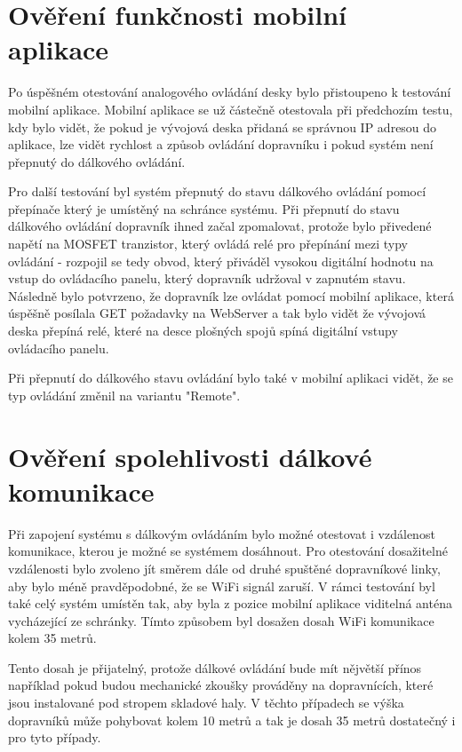 \section{Ověření funkčnosti mobilní aplikace}

Po úspěšném otestování analogového ovládání desky bylo přistoupeno k testování mobilní aplikace. Mobilní aplikace se už částečně otestovala při předchozím testu, kdy bylo vidět, že pokud je vývojová deska přidaná se správnou IP adresou do aplikace, lze vidět rychlost a způsob ovládání dopravníku i pokud systém není přepnutý do dálkového ovládání.

Pro další testování byl systém přepnutý do stavu dálkového ovládání pomocí přepínače který je umístěný na schránce systému. Při přepnutí do stavu dálkového ovládání dopravník ihned začal zpomalovat, protože bylo přivedené napětí na MOSFET tranzistor, který ovládá relé pro přepínání mezi typy ovládání - rozpojil se tedy obvod, který přiváděl vysokou digitální hodnotu na vstup do ovládacího panelu, který dopravník udržoval v zapnutém stavu. Následně bylo potvrzeno, že dopravník lze ovládat pomocí mobilní aplikace, která úspěšně posílala GET požadavky na WebServer a tak bylo vidět že vývojová deska přepíná relé, které na desce plošných spojů spíná digitální vstupy ovládacího panelu.

Při přepnutí do dálkového stavu ovládání bylo také v mobilní aplikaci vidět, že se typ ovládání změnil na variantu "Remote".

\section{Ověření spolehlivosti dálkové komunikace}

Při zapojení systému s dálkovým ovládáním bylo možné otestovat i vzdálenost komunikace, kterou je možné se systémem dosáhnout. Pro otestování dosažitelné vzdálenosti bylo zvoleno jít směrem dále od druhé spuštěné dopravníkové linky, aby bylo méně pravděpodobné, že se WiFi signál zaruší. V rámci testování byl také celý systém umístěn tak, aby byla z pozice mobilní aplikace viditelná anténa vycházející ze schránky. Tímto způsobem byl dosažen dosah WiFi komunikace kolem 35 metrů.

Tento dosah je přijatelný, protože dálkové ovládání bude mít nějvětší přínos například pokud budou mechanické zkoušky prováděny na dopravnících, které jsou instalované pod stropem skladové haly. V těchto případech se výška dopravníků může pohybovat kolem 10 metrů a tak je dosah 35 metrů dostatečný i pro tyto případy.

